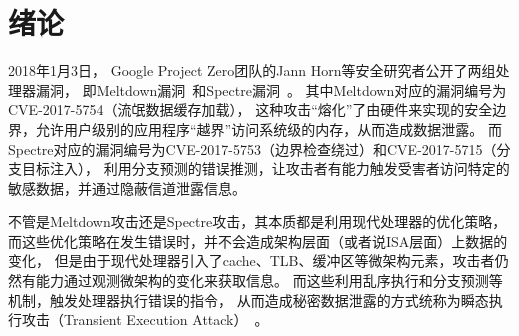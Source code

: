 %
%

\chapter{绪论}\label{chap1}

2018年1月3日， Google Project Zero团队的Jann Horn等安全研究者公开了两组处理器漏洞，
即Meltdown漏洞~\cite{Lipp2018meltdown}和Spectre漏洞~\cite{kocher2019spectre}。
其中Meltdown对应的漏洞编号为CVE-2017-5754（流氓数据缓存加载），
这种攻击“熔化”了由硬件来实现的安全边界，允许用户级别的应用程序“越界”访问系统级的内存，从而造成数据泄露。
而Spectre对应的漏洞编号为CVE-2017-5753（边界检查绕过）和CVE-2017-5715（分支目标注入），
利用分支预测的错误推测，让攻击者有能力触发受害者访问特定的敏感数据，并通过隐蔽信道泄露信息。

不管是Meltdown攻击还是Spectre攻击，其本质都是利用现代处理器的优化策略，
而这些优化策略在发生错误时，并不会造成架构层面（或者说ISA层面）上数据的变化，
但是由于现代处理器引入了cache、TLB、缓冲区等微架构元素，攻击者仍然有能力通过观测微架构的变化来获取信息。
而这些利用乱序执行和分支预测等机制，触发处理器执行错误的指令，
从而造成秘密数据泄露的方式统称为瞬态执行攻击（Transient Execution Attack）~\cite{xiong2021survey}。
